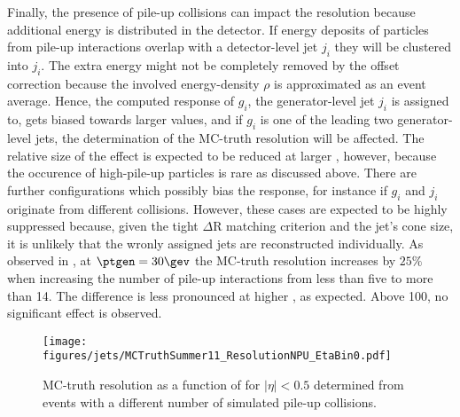 Finally, the presence of pile-up collisions can impact the resolution because additional energy is distributed in the detector.
If energy deposits of particles from pile-up interactions overlap with a detector-level jet $j_{i}$ they will be clustered into $j_{i}$.
The extra energy might not be completely removed by the offset correction because the involved energy-density $\rho$ is approximated as an event average.
Hence, the computed response of $g_{i}$, the generator-level jet $j_{i}$ is assigned to, gets biased towards larger values, and if $g_{i}$ is one of the leading two generator-level jets, the determination of the MC-truth resolution will be affected.
The relative size of the effect is expected to be reduced at larger \pt, however, because the occurence of high-\pt pile-up particles is rare as discussed above.
There are further configurations which possibly bias the response, for instance if $g_{i}$ and $j_{i}$ originate from different collisions.
However, these cases are expected to be highly suppressed because, given the tight $\Delta\text{R}$ matching criterion and the jet's cone size, it is unlikely that the wronly assigned jets are reconstructed individually.
As observed in , at \mbox{$\ptgen = 30\gev$} the MC-truth resolution increases by $25\%$ when increasing the number of pile-up interactions from less than five to more than 14.
The difference is less pronounced at higher \pt, as expected.
Above 100\gev, no significant effect is observed.
\begin{figure}[!ht]
  \centering
   \texttt{[image: figures/jets/MCTruthSummer11\_ResolutionNPU\_EtaBin0.pdf]}
 \caption{MC-truth resolution as a function of \ptgen for \mbox{$|\eta| < 0.5$} determined from events with a different number of simulated pile-up collisions.}
  \label{fig:Jets:Resolution:MCTruth:PU}
\end{figure}





